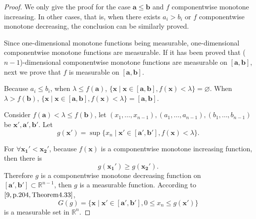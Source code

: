 \documentclass{ijclclp}
\begin{document}
\begin{proof}
    We only give the proof for the case \(\boldsymbol{a}\leq\boldsymbol{b}\) and \(f\) componentwise monotone increasing. In other cases, that is, when there exists \(a_i>b_i\) or \(f\) componentwise monotone decreasing, the conclusion can be similarly proved.

    Since one-dimensional monotone functions being measurable, one-dimensional componentwise monotone functions are measurable. If it has been proved that ($n-1$)-dimensional componentwise monotone functions are measurable on \([\boldsymbol{a},\boldsymbol{b}]\), next we prove that \(f\) is measurable on \([\boldsymbol{a},\boldsymbol{b}]\).

    Because \(a_i\leq b_i\), when \(\lambda\leq f(\boldsymbol{a})\), \(\{\boldsymbol{x}\mid \boldsymbol{x}\in[\boldsymbol{a},\boldsymbol{b}],f(\boldsymbol{x})<\lambda\}=\varnothing\). When \(\lambda>f(\boldsymbol{b})\), \(\{\boldsymbol{x}\mid \boldsymbol{x}\in[\boldsymbol{a},\boldsymbol{b}],f(\boldsymbol{x})<\lambda\}=[\boldsymbol{a},\boldsymbol{b}]\).

    Consider \(f(\boldsymbol{a})<\lambda\leq f(\boldsymbol{b})\), let \((x_1, \dots, x_{n-1}), (a_1, \dots, a_{n-1}), (b_1, \dots, b_{n-1})\) be \(\boldsymbol{x}', \boldsymbol{a}', \boldsymbol{b}'\). Let
    \[g(\boldsymbol{x}')=\sup\{x_n\mid \boldsymbol{x}'\in[\boldsymbol{a}',\boldsymbol{b}'],f(\boldsymbol{x})<\lambda\}.\]

    For \(\forall \boldsymbol{x_1}'<\boldsymbol{x_2}'\), because \(f(\boldsymbol{x})\) is a componentwise monotone increasing function, then there is
    \[g(\boldsymbol{x_1}')\geq g(\boldsymbol{x_2}').\]
    Therefore \(g\) is a componentwise monotone decreasing function on \([\boldsymbol{a}',\boldsymbol{b}']\subset\mathbb{R}^{n-1}\), then \(g\) is a measurable function. According to \([9,\rm{p}.204,Theorem 4.33]\),
    \[G(g)=\{\boldsymbol{x}\mid \boldsymbol{x}'\in[\boldsymbol{a}',\boldsymbol{b}'],0\leq x_n\leq g(\boldsymbol{x'})\}\]
    is a measurable set in \(\mathbb{R}^n\).


\end{proof}
\end{document}
